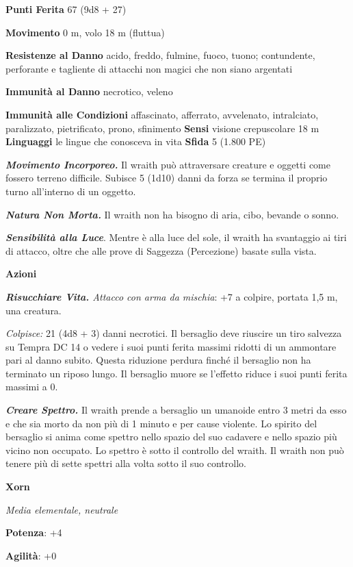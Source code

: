 \begin{multicols}{2}
\textbf{Punti Ferita} 67 (9d8 + 27)

\textbf{Movimento} 0 m, volo 18 m (fluttua)

\textbf{Resistenze al Danno} acido, freddo, fulmine, fuoco, tuono;
contundente, perforante e tagliente di attacchi non magici che non siano
argentati

\textbf{Immunità al Danno} necrotico, veleno

\textbf{Immunità alle Condizioni} affascinato, afferrato, avvelenato,
intralciato, paralizzato, pietrificato, prono, sfinimento \textbf{Sensi}
visione crepuscolare 18 m \textbf{Linguaggi} le lingue
che conosceva in vita \textbf{Sfida} 5 (1.800 PE)

\emph{\textbf{Movimento Incorporeo.}} Il wraith può attraversare
creature e oggetti come fossero terreno difficile. Subisce 5 (1d10)
danni da forza se termina il proprio turno all'interno di un oggetto.

\emph{\textbf{Natura Non Morta.}} Il wraith non ha bisogno di aria,
cibo, bevande o sonno.

\emph{\textbf{Sensibilità alla Luce}}. Mentre è alla luce del sole, il
wraith ha svantaggio ai tiri di attacco, oltre che alle prove di
Saggezza (Percezione) basate sulla vista.

\textbf{Azioni}

\emph{\textbf{Risucchiare Vita.} Attacco con arma da mischia}: +7 a
colpire, portata 1,5 m, una creatura.

\emph{Colpisce:} 21 (4d8 + 3) danni necrotici. Il bersaglio deve
riuscire un tiro salvezza su Tempra DC 14 o vedere i suoi punti
ferita massimi ridotti di un ammontare pari al danno subito. Questa
riduzione perdura finché il bersaglio non ha terminato un riposo lungo.
Il bersaglio muore se l'effetto riduce i suoi punti ferita massimi a 0.

\emph{\textbf{Creare Spettro.}} Il wraith prende a bersaglio un umanoide
entro 3 metri da esso e che sia morto da non più di 1 minuto e per cause
violente. Lo spirito del bersaglio si anima come spettro nello spazio
del suo cadavere e nello spazio più vicino non occupato. Lo spettro è
sotto il controllo del wraith. Il wraith non può tenere più di sette
spettri alla volta sotto il suo controllo.

\textbf{Xorn}

\emph{Media elementale, neutrale}

\textbf{Potenza}: +4

\textbf{Agilità}: +0


\end{multicols}
